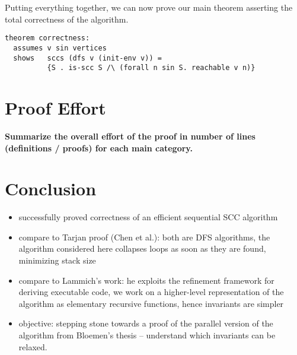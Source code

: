 \documentclass[sigplan,10pt,anonymous,review]{acmart}
\begin{document}
Putting everything together, we can now prove our main theorem asserting the total correctness of the algorithm.

\begin{small}
\begin{lstlisting}[language=isabelle]
theorem correctness:
  assumes v sin vertices
  shows   sccs (dfs v (init-env v)) = 
          {S . is-scc S /\ (forall n sin S. reachable v n)}
\end{lstlisting}
\end{small}

\section{Proof Effort}
\label{sec:effort}

\textbf{Summarize the overall effort of the proof in number of lines (definitions / proofs) for each main category.}


\section{Conclusion}
\label{sec:conclusion}

\begin{itemize}
\item successfully proved correctness of an efficient sequential SCC algorithm
\item compare to Tarjan proof (Chen et al.): both are DFS algorithms, the algorithm considered here collapses loops as soon as they are found, minimizing stack size
\item compare to Lammich's work: he exploits the refinement framework for deriving executable code, we work on a higher-level representation of the algorithm as elementary recursive functions, hence invariants are simpler
\item objective: stepping stone towards a proof of the parallel version of the algorithm from Bloemen's thesis -- understand which invariants can be relaxed.
\end{itemize}




\end{document}
